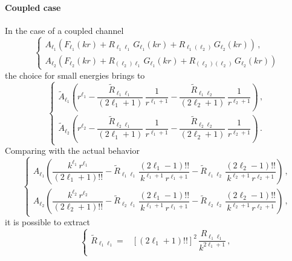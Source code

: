 \documentclass[10pt,a4paper]{article}
\begin{document}
\begin{appendices}
		\paragraph{Coupled case}
		In the case of a coupled channel
		\begin{equation}
			\begin{cases}
				A_{\ell_1} \left(F_{\ell_1}(kr) + R_{\ell_1\ell_1}\,G_{\ell_1}(kr) + 
				R_{\ell_1(\ell_2)}\,G_{\ell_2}(kr)\right)\,,\\
				A_{\ell_2} \left(F_{\ell_2}(kr) + R_{(\ell_2)\ell_1}\,G_{\ell_1}(kr) + 
				R_{(\ell_2)(\ell_2)}\,G_{\ell_2}(kr)\right)
			\end{cases}
		\end{equation}
		the choice for small energies brings to
		\begin{equation}
			\begin{cases}
				\tilde{A}_{\ell_1}
				\left(
				r^{\ell_1} - \dfrac{\tilde{R}_{\ell_1\ell_1}}{(2\ell_1+1)}\,
				\dfrac{1}{r^{\ell_1+1}} - \dfrac{\tilde{R}_{\ell_1\ell_2}}{(2\ell_2+1)}\,
				\dfrac{1}{r^{\ell_2+1}}
				\right)\,,\\[2.5ex]
				\tilde{A}_{\ell_2}
				\left(
				r^{\ell_2} - \dfrac{\tilde{R}_{\ell_2\ell_1}}{(2\ell_1+1)}\,
				\dfrac{1}{r^{\ell_1+1}} - \dfrac{\tilde{R}_{\ell_2\ell_2}}{(2\ell_2+1)}\,
				\dfrac{1}{r^{\ell_2+1}}
				\right)\,.
			\end{cases}
		\end{equation}
		Comparing with the actual behavior
		\begin{equation}
			\begin{cases}
				A_{\ell_1}
				\left(
				\dfrac{k^{\ell_1}\,r^{\ell_1}}{(2\ell_1+1)!!} - \tilde{R}_{\ell_1\ell_1}\,
				\dfrac{(2\ell_1-1)!!}{k^{\ell_1+1}\,r^{\ell_1+1}} - \tilde{R}_{\ell_1\ell_2}\,
				\dfrac{(2\ell_2-1)!!}{k^{\ell_2+1}\,r^{\ell_2+1}}
				\right)\,,\\[2.5ex]
				A_{\ell_2}
				\left(
				\dfrac{k^{\ell_2}\,r^{\ell_2}}{(2\ell_2+1)!!} - \tilde{R}_{\ell_2\ell_1}\,
				\dfrac{(2\ell_1-1)!!}{k^{\ell_1+1}\,r^{\ell_1+1}} - \tilde{R}_{\ell_2\ell_2}\,
				\dfrac{(2\ell_2-1)!!}{k^{\ell_2+1}\,r^{\ell_2+1}}
				\right)\,,
			\end{cases}
		\end{equation}
		it is possible to extract
		\begin{equation}
			\begin{cases}
				\tilde{R}_{\ell_1\ell_1} =& 
				\left[(2\ell_1+1)!!\right]^2\,\dfrac{R_{\ell_1\ell_1}}{k^{2\ell_1+1}}\,,\\[2.ex]

\end{cases}
\end{equation}
\end{appendices}
\end{document}
